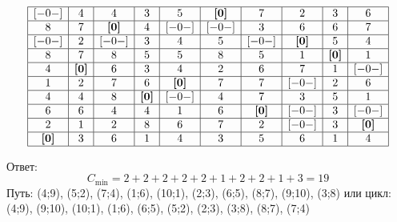 \documentclass[17pt]{extarticle}
\begin{document}
\[
    \begin{array}{|*{10}{c|}}
        \hline
        [-0-]        & 4            & 4            & 3            & 5            & \textbf{[0]} & 7            & 2            & 3            & 6            \\
        \hline
        8            & 7            & \textbf{[0]} & 4            & [-0-]        & [-0-]        & 3            & 6            & 6            & 7            \\
        \hline
        [-0-]        & 2            & [-0-]        & 3            & 4            & 5            & [-0-]        & \textbf{[0]} & 5            & 4            \\
        \hline
        8            & 7            & 8            & 5            & 5            & 8            & 5            & 1            & \textbf{[0]} & 1            \\
        \hline
        4            & \textbf{[0]} & 6            & 3            & 4            & 2            & 6            & 7            & 1            & [-0-]        \\
        \hline
        1            & 2            & 7            & 6            & \textbf{[0]} & 7            & 7            & [-0-]        & 2            & 6            \\
        \hline
        4            & 4            & 8            & \textbf{[0]} & [-0-]        & 4            & 7            & 3            & 5            & 1            \\
        \hline
        6            & 6            & 4            & 4            & 1            & 6            & \textbf{[0]} & [-0-]        & 3            & [-0-]        \\
        \hline
        2            & 1            & 2            & 8            & 6            & 7            & 2            & [-0-]        & 3            & \textbf{[0]} \\
        \hline
        \textbf{[0]} & 3            & 6            & 1            & 4            & 3            & 5            & 6            & 1            & 4            \\
        \hline
    \end{array}
\]

Ответ:
\[
    C_{\text{min}} = 2 + 2 + 2 + 2 + 2 + 1 + 2 + 2 + 1 + 3 = 19
\]
Путь: (4;9), (5;2), (7;4), (1;6), (10;1), (2;3), (6;5), (8;7), (9;10), (3;8)
или цикл: (4;9), (9;10), (10;1), (1;6), (6;5), (5;2), (2;3), (3;8), (8;7), (7;4)
\end{document}
